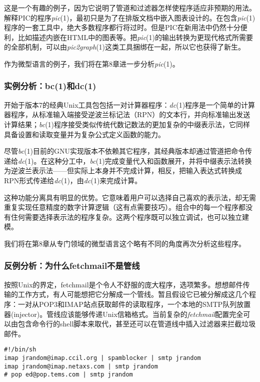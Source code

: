 \documentclass[12pt,oneside]{ctexbook}
\begin{document}
\begin{common-format}
这是一个有趣的例子，因为它说明了管道和过滤器怎样使程序适应非预期的用法。解释PIC的程序\textit{pic}(1)，最初只是为了在排版文档中嵌入图表设计的。在包含\textit{pic}(1)程序的一套工具中，绝大多数程序都行将过时。但是PIC在新用法中仍然十分便利，比如描述内嵌在HTML中的图表等。把\textit{pic}(1)的输出转换为更现代格式所需要的全部机制，可以由\textit{pic2graph}(1)这类工具捆绑在一起，所以它也获得了新生。

作为微型语言的例子，我们将在第8章进一步分析\textit{pic}(1)。

\subsubsection{实例分析：bc(1)和dc(1)}
开始于版本7的经典Unix工具包包括一对计算器程序：\textit{dc}(1)程序是一个简单的计算器程序，从标准输入端接受逆波兰标记法（RPN）的文本行，并向标准输出发送计算结果；\textit{bc}(1)程序接受类似传统代数记数法的更加复杂的中缀表示法，它同样具备设置和读取变量并为复杂公式定义函数的能力。

尽管\textit{bc}(1)目前的GNU实现版本不依赖其它程序，其经典版本却通过管道把命令传递给\textit{dc}(1)。在这种分工中，\textit{bc}(1)完成变量代入和函数展开，并将中缀表示法转换为逆波兰表示法——但实际上本身并不完成计算，相反，把输入表达式转换成RPN形式传递给\textit{dc}(1)，由\textit{dc}(1)来完成计算。

这种功能分离具有明显的优势。它意味着用户可以选择自己喜欢的表示法，却无需重复实现任意精度的数字计算逻辑（这有点需要技巧）。组合中的每一个程序都没有住何需要选择表示法的程序复杂。这两个程序既可以独立调试，也可以独立建模。

我们将在第8章从专门领域的微型语言这个略有不同的角度再次分析这些程序。


\subsubsection{反例分析：为什么fetchmail不是管线}
按照Unix的界定，fetchmail是个令人不舒服的庞大程序，选项繁多。想想邮件传输的工作方式，有人可能想把它分解成一个管线。暂且假设它已被分解成这几个程序：一对从POP3和IMAP站点获取邮件的读取程序，一个本地的SMTP队列放置器(injector)。管线应该能够传递Unix信箱格式。当前复杂的\textit{fetchmail}配置完全可以由包含命令行的shell脚本来取代，甚至还可以在管道线中插入过滤器来拦截垃圾邮件。

\begin{Verbatim}
#!/bin/sh
imap jrandom@imap.ccil.org | spamblocker | smtp jrandom
imap jrandom@imap.netaxs.com | smtp jrandom
# pop ed@pop.tems.com | smtp jrandom
\end{Verbatim}


\end{common-format}
\end{document}
